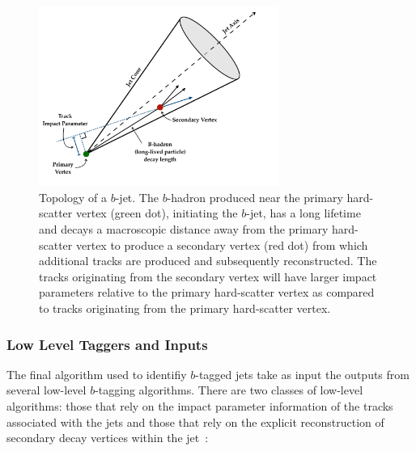 \begin{figure}[!htb]
    \begin{center}
        \includegraphics[width=0.7\textwidth]{figures/chapter3/ftag/bhadron_decayPDF}
        \caption{
            Topology of a $b$-jet.
            The $b$-hadron produced near the primary hard-scatter vertex (green dot), initiating the
            $b$-jet, has a long lifetime and decays a macroscopic distance away from the primary
            hard-scatter vertex to produce a secondary vertex (red dot) from which additional tracks
            are produced and subsequently reconstructed.
            The tracks originating from the secondary vertex will have larger impact parameters relative
            to the primary hard-scatter vertex as compared to tracks originating from the primary
            hard-scatter vertex.
        }
        \label{fig:bjet_decay}
    \end{center}
\end{figure}

\subsubsection{Low Level Taggers and Inputs}
\label{sec:ftag_low_level}

The final algorithm used to identifiy $b$-tagged jets take as input the outputs from several low-level
$b$-tagging algorithms.
There are two classes of low-level algorithms: those that rely on the impact parameter information of the
tracks associated with the jets and those that rely on the explicit reconstruction of secondary decay vertices
within the jet~\cite{FTAG2019}:

